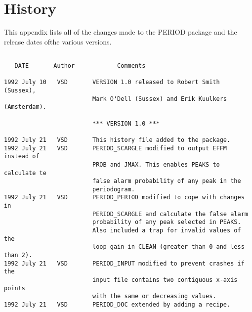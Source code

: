 \clearpage
\appendix


\section{History}

{\noindent This appendix lists all of the changes made to the PERIOD
package and the release dates of\newline the various versions.}
\vspace{10mm}



\begin{verbatim}

   DATE       Author            Comments

1992 July 10   VSD       VERSION 1.0 released to Robert Smith (Sussex),
                         Mark O'Dell (Sussex) and Erik Kuulkers (Amsterdam).

                         *** VERSION 1.0 ***

1992 July 21   VSD       This history file added to the package.
1992 July 21   VSD       PERIOD_SCARGLE modified to output EFFM instead of
                         PROB and JMAX. This enables PEAKS to calculate te
                         false alarm probability of any peak in the
                         periodogram.
1992 July 21   VSD       PERIOD_PERIOD modified to cope with changes in
                         PERIOD_SCARGLE and calculate the false alarm
                         probability of any peak selected in PEAKS.
                         Also included a trap for invalid values of the
                         loop gain in CLEAN (greater than 0 and less than 2).
1992 July 21   VSD       PERIOD_INPUT modified to prevent crashes if the
                         input file contains two contiguous x-axis points
                         with the same or decreasing values.
1992 July 21   VSD       PERIOD_DOC extended by adding a recipe.

\end{verbatim}



\newpage


